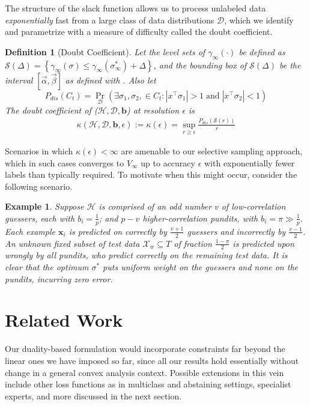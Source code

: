 \documentclass{colt2015} %
\newtheorem{defn}[thm]{Definition}
\newtheorem{examp}{Example}
\newcommand{\vx}{\mathbf{x}}
\newcommand{\vb}{\mathbf{b}}
\newcommand{\valpha}{\vec{\alpha}}
\newcommand{\vbeta}{\vec{\beta}}
\DeclareMathOperator{\Prtxt}{Pr}
\newcommand{\abs}[1]{\left| #1 \right|}
\newcommand{\prp}[2]{\Prtxt_{#2} \left(#1\right)}
\newcommand{\cH}{\mathcal{H}}
\newcommand{\cX}{\mathcal{X}}
\newcommand{\cD}{\mathcal{D}}
\newcommand{\cS}{\mathcal{S}}
\newcommand{\pdis}[1]{P_{dis}\left(#1\right)}
\newcommand{\lrsetb}[1]{\left\{#1\right\}}
\newcommand{\authcmt}[2]{\textcolor{#1}{}}
\newcommand{\akshay}[1]{\authcmt{red}{[AB: #1]}}
\begin{document}
The structure of the slack function allows us 
to process unlabeled data \emph{exponentially} fast 
from a large class of data distributions $\cD$, 
which we identify and parametrize with a measure of difficulty called the doubt coefficient. 

\begin{defn}[Doubt Coefficient]
Let the level sets of $\gamma_{\infty} (\cdot)$ be defined as 
$\cS (\Delta) = \lrsetb{ \gamma_{\infty} (\sigma) \leq \gamma_{\infty} (\sigma_{\infty}^*) + \Delta}$, 
and the bounding box of $\cS (\Delta)$ be the interval $[\valpha, \vbeta]$ as defined 
with . 
Also let 
$$\pdis{C_t} = \prp{\exists \sigma_1, \sigma_2, \in C_t : \abs{x^\top \sigma_1} > 1 \;\text{and}\; \abs{x^\top \sigma_2} < 1 }{\cD}$$
The \emph{doubt coefficient} of ($\cH, \cD, \vb$) at resolution $\epsilon$ is 
\begin{align*}
\kappa (\cH, \cD, \vb, \epsilon) := \kappa (\epsilon) = \sup_{r \geq \epsilon} \frac{\pdis{\cS (r)}}{r}
\end{align*}
\end{defn}

\akshay{Finished highlighting naive algorithm in previous subsection. 
Now am writing the definitions and example in this section, though I still need to work out that the example fits the doubt coeff. condition.}

Scenarios in which $\kappa (\epsilon) < \infty$ are amenable to our selective sampling approach, 
which in such cases converges to $V_{\infty}$ up to accuracy $\epsilon$ with exponentially fewer labels than typically required. 
To motivate when this might occur, 
consider the following scenario. 

\begin{examp}
\normalfont
Suppose $\cH$ is comprised of an odd number $v$ of low-correlation \emph{guessers}, each with $b_i = \frac{1}{p}$;  
and $p - v$ higher-correlation \emph{pundits}, with $b_i = \pi \gg \frac{1}{p}$. 
Each example $\vx_i$ is predicted on correctly by $\frac{v+1}{2}$ guessers and incorrectly by $\frac{v-1}{2}$. 
An unknown fixed subset of test data $\cX_w \subseteq T$ of fraction $\frac{1- \pi}{2}$ is predicted upon wrongly by all pundits, 
who predict correctly on the remaining test data.
It is clear that the optimum $\sigma^*$ puts uniform weight on the guessers and none on the pundits, 
incurring zero error.  
\end{examp}

\fi


\section{Related Work}
\label{sec:relwork}
Our duality-based formulation would incorporate constraints far beyond the linear ones we have imposed so far, 
since all our results hold essentially without change in a general convex analysis context. 
Possible extensions in this vein include other loss functions as in multiclass and abstaining settings, specialist experts, 
and more discussed in the next section.
\end{document}
